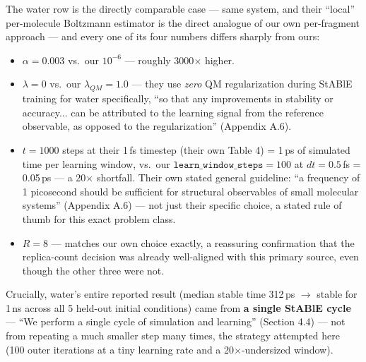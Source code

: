 \documentclass[11pt]{article}
\begin{document}
The water row is the directly comparable case --- same system, and their
``local'' per-molecule Boltzmann estimator is the direct analogue of our own
per-fragment approach --- and every one of its four numbers differs sharply
from ours:
\begin{itemize}
  \item $\alpha=0.003$ vs.\ our $10^{-6}$ --- roughly 3000$\times$ higher.
  \item $\lambda=0$ vs.\ our $\lambda_{QM}=1.0$ --- they use \emph{zero} QM
  regularization during StABlE training for water specifically, ``so that
  any improvements in stability or accuracy... can be attributed to the
  learning signal from the reference observable, as opposed to the
  regularization'' (Appendix A.6).
  \item $t=1000$ steps at their 1\,fs timestep (their own Table 4) = 1\,ps of
  simulated time per learning window, vs.\ our
  $\texttt{learn\_window\_steps}=100$ at $dt=0.5$\,fs = 0.05\,ps --- a
  20$\times$ shortfall. Their own stated general guideline: ``a frequency of
  1 picosecond should be sufficient for structural observables of small
  molecular systems'' (Appendix A.6) --- not just their specific choice, a
  stated rule of thumb for this exact problem class.
  \item $R=8$ --- matches our own choice exactly, a reassuring confirmation
  that the replica-count decision was already well-aligned with this primary
  source, even though the other three were not.
\end{itemize}

Crucially, water's entire reported result (median stable time 312\,ps
$\to$ stable for 1\,ns across all 5 held-out initial conditions) came from
\textbf{a single StABlE cycle} --- ``We perform a single cycle of simulation
and learning'' (Section 4.4) --- not from repeating a much smaller step many
times, the strategy attempted here (100 outer iterations at a tiny learning
rate and a 20$\times$-undersized window).
\end{document}
